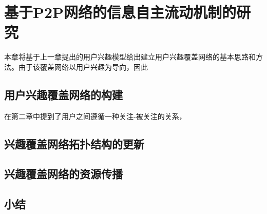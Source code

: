 \section{基于P2P网络的信息自主流动机制的研究}
本章将基于上一章提出的用户兴趣模型给出建立用户兴趣覆盖网络的基本思路和方法。由于该覆盖网络以用户兴趣为导向，因此

\subsection{用户兴趣覆盖网络的构建}
在第二章中提到了用户之间遵循一种关注-被关注的关系，

\subsection{兴趣覆盖网络拓扑结构的更新}
\subsection{兴趣覆盖网络的资源传播}
\subsection{小结}
